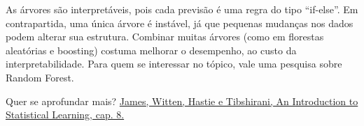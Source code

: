 {\subtitle{Pontos fortes e limitações}

\hspace*{1.5em}
As árvores são interpretáveis, pois cada previsão é uma regra do tipo ``if-else''.
Em contrapartida, uma única árvore é instável,
já que pequenas mudanças nos dados podem alterar sua estrutura.
Combinar muitas árvores (como em florestas aleatórias e boosting) costuma melhorar o desempenho, ao custo da interpretabilidade.
Para quem se interessar no tópico, vale uma pesquisa sobre Random Forest.


\vspace{0.3em}
{\small\color{HypePurple2}Quer se aprofundar mais?}
\href{https://www.statlearning.com/}{James, Witten, Hastie e Tibshirani, An Introduction to Statistical Learning, cap. 8.}

}